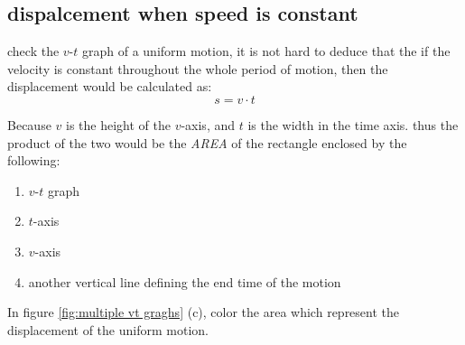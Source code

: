 \documentclass[a4paper]{tufte-handout}
\newenvironment{TaskBox} %
{\begin{tcolorbox}[breakable,colback=b1!30,colframe=b1,title=Task]} {\end{tcolorbox}}
\begin{document}
\subsection{dispalcement when speed is constant}
check the $v$-$t$ graph of a uniform motion, it is not hard to deduce that the if the velocity is constant throughout the whole period of motion, then the displacement would be calculated as:
\[
  s = v\cdot t
\]

Because $v$ is the height of the $v$-axis, and $t$ is the width in the time axis. thus the product of the two would be the \emph{AREA} of the rectangle enclosed by the following:
\begin{enumerate}
  \item $v$-$t$ graph
  \item $t$-axis
  \item $v$-axis
  \item another vertical line defining the end time of the motion
\end{enumerate}

\begin{TaskBox}
In figure \ref{fig:multiple vt graghs} (c),  color the area which represent the displacement of the uniform motion. 
\end{TaskBox}
\end{document}
